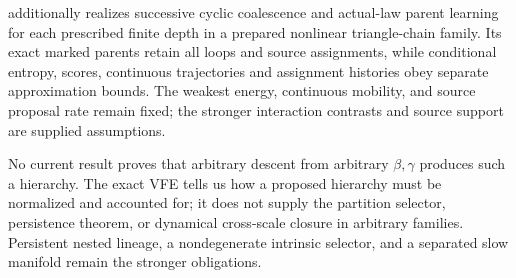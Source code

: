  additionally realizes successive cyclic
coalescence and actual-law parent learning for each prescribed finite depth
in a prepared nonlinear triangle-chain family. Its exact marked parents
retain all loops and source assignments, while conditional entropy, scores,
continuous trajectories and assignment histories obey separate approximation
bounds. The weakest energy, continuous mobility, and source proposal rate
remain fixed; the stronger interaction contrasts and source support are
supplied assumptions.

No current result proves that arbitrary descent from arbitrary
$\beta,\gamma$ produces such a hierarchy. The exact VFE tells us how a
proposed hierarchy must be normalized and accounted for; it does not supply
the partition selector, persistence theorem, or dynamical cross-scale
closure in arbitrary families. Persistent nested lineage, a nondegenerate
intrinsic selector, and a separated slow manifold remain the stronger
obligations. 
